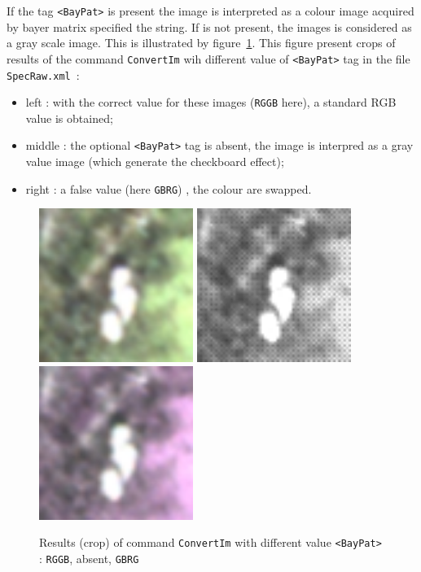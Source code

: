 If the tag {\tt <BayPat>} is present the image is interpreted as a colour image acquired by bayer matrix 
specified the string. If is not present, the images is considered  as a gray scale image. This is 
illustrated by figure~\ref{FIG:RawBayer}. This figure present crops of results of the command 
{\tt ConvertIm} wih different value of {\tt <BayPat>} tag in the file {\tt  SpecRaw.xml}~:


\begin{itemize}
       \item left : with the correct value for these images ({\tt RGGB} here), a standard RGB value
             is obtained;

       \item middle : the optional {\tt <BayPat>} tag is absent, the image is interpred as a gray value
             image (which generate the checkboard effect);

       \item right : a false value (here  {\tt GBRG}) , the colour are swapped. 
\end{itemize}

\begin{figure}
\begin{center}
\includegraphics[width=50mm]{FIGS/RawImages/Coul.jpg}
\includegraphics[width=50mm]{FIGS/RawImages/Gray.jpg}
\includegraphics[width=50mm]{FIGS/RawImages/CoulBuged.jpg}
\end{center}
\caption{Results (crop) of command {\tt ConvertIm} with different value {\tt <BayPat>} : {\tt RGGB}, absent, {\tt GBRG}   }
\label{FIG:RawBayer}
\end{figure}


